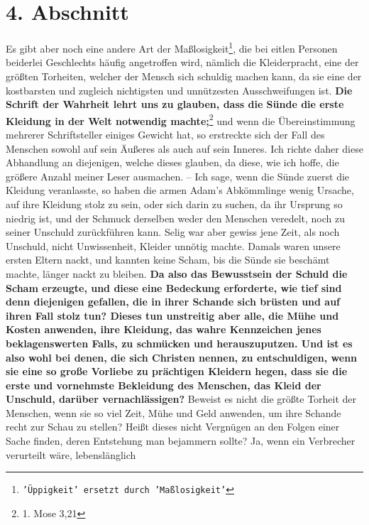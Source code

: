 \section{4. Abschnitt} \label{kap14_ab4}

Es gibt aber noch eine andere Art der Maßlosigkeit\footnote{\texttt{'Üppigkeit'
ersetzt
durch 'Maßlosigkeit'}}, die bei eitlen Personen beiderlei
Geschlechts häufig angetroffen wird, nämlich die Kleiderpracht,
eine der
größten Torheiten, welcher der Mensch sich schuldig machen kann, da sie eine
der kostbarsten und zugleich nichtigsten und unnützesten Ausschweifungen ist.
\textbf{Die
Schrift der Wahrheit lehrt uns zu glauben, dass die Sünde die erste Kleidung in
der
Welt notwendig machte;}\footnote{1. Mose 3,21}
und wenn die Übereinstimmung
mehrerer Schriftsteller einiges Gewicht hat, so erstreckte sich der Fall des
Menschen sowohl auf sein Äußeres als auch auf sein Inneres. Ich richte daher
diese
Abhandlung an diejenigen, welche dieses glauben, da diese, wie ich hoffe, die
größere Anzahl meiner Leser ausmachen. -- Ich sage, wenn die Sünde zuerst die
Kleidung veranlasste, so haben die armen Adam’s
Abkömmlinge wenig Ursache, auf
ihre Kleidung stolz zu sein, oder sich darin zu suchen, da ihr Ursprung so
niedrig ist, und der Schmuck derselben weder den Menschen veredelt, noch zu
seiner Unschuld zurückführen kann. Selig war aber gewiss jene Zeit, als noch
Unschuld, nicht Unwissenheit, Kleider unnötig machte. Damals waren unsere ersten
Eltern nackt, und kannten keine Scham, bis die Sünde sie beschämt
machte,
länger nackt zu bleiben. \label{ref:14_04_wahre_nachfolger_kleidung}
\textbf{Da also das Bewusstsein der Schuld die Scham erzeugte,
und diese eine Bedeckung erforderte, wie tief sind denn diejenigen gefallen, die
in ihrer Schande sich brüsten und auf ihren Fall stolz tun? Dieses tun
unstreitig aber alle, die Mühe und Kosten anwenden, ihre Kleidung, das wahre
Kennzeichen jenes beklagenswerten Falls, zu schmücken und herauszuputzen. Und
ist es also wohl bei denen, die sich Christen nennen, zu entschuldigen, wenn sie
eine so große Vorliebe zu prächtigen Kleidern hegen, dass sie die erste und
vornehmste Bekleidung des Menschen, das Kleid der Unschuld, darüber
vernachlässigen?} Beweist es nicht die größte Torheit der Menschen, wenn sie so
viel Zeit, Mühe und Geld anwenden, um ihre Schande recht zur Schau zu stellen?
Heißt dieses nicht Vergnügen an den Folgen einer Sache finden, deren Entstehung
man bejammern sollte? Ja, wenn ein Verbrecher verurteilt wäre, lebenslänglich
